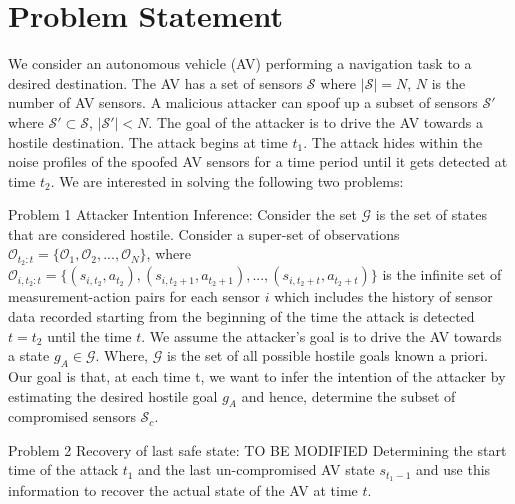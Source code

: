 \documentclass[conference]{IEEEtran}
\begin{document}
\section{Problem Statement}\label{sec:problem}
We consider an autonomous vehicle (AV) performing a navigation task to a desired destination. The AV has a set of sensors $\mathcal{S}$ where $|\mathcal{S}|=N$, $N$ is the number of AV sensors. A malicious attacker can spoof up a subset of sensors $\mathcal{S'}$ where $\mathcal{S'} \subset \mathcal{S}$, $|\mathcal{S'}| < N$. The goal of the attacker is to drive the AV towards a hostile destination. The attack begins at time $t_1$. The attack hides within the noise profiles of the spoofed AV sensors for a time period until it gets detected at time $t_2$.
We are interested in solving the following two problems:

Problem 1 Attacker Intention Inference: Consider the set $\mathcal{G}$ is the set of states that are considered hostile. Consider a super-set of observations $\mathcal{O}_{t_2:t} = \{\mathcal{O}_1, \mathcal{O}_2, ..., \mathcal{O}_N\}$, where $\mathcal{O}_{i,t_2:t} = \{(s_{i,t_2}, a_{t_2}), (s_{i,t_2+1}, a_{t_2+1}), ..., (s_{i,t_2+t}, a_{t_2+t})\}$ is the infinite set of measurement-action pairs for each sensor $i$ which includes the history of sensor data recorded starting from the beginning of the time the attack is detected $t = t_2$ until the time $t$. We assume the attacker's goal is to drive the AV towards a state $g_A \in \mathcal{G}$. Where, $\mathcal{G}$ is the set of all possible hostile goals known a priori. Our goal is that, at each time t, we want to infer the intention of the attacker by estimating the desired hostile goal $g_A$ and hence, determine the subset of compromised sensors $\mathcal{S}_c$.



Problem 2 Recovery of last safe state:
TO BE MODIFIED
Determining the start time of the attack $t_1$ and the last un-compromised AV state $s_{t_1-1}$ and use this information to recover the actual state of the AV at time $t$.
\end{document}
